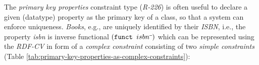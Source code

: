 \documentclass[a4paper,fontsize=11pt]{scrartcl}
\newcommand{\ms}[1]{\texttt{#1}}
\begin{document}
%
%
%
The \emph{primary key properties} constraint type (\emph{R-226}) is often useful to declare a given (datatype) property as the primary key of a class, so that a system can enforce uniqueness. 
\emph{Books}, e.g., are uniquely identified by their \emph{ISBN}, i.e., the property \emph{isbn} is inverse functional \ms{$(\ms{funct } isbn\sp{\overline{\ }})$}
which can be represented using the \emph{RDF-CV} in form of a \emph{complex constraint} consisting of two \emph{simple constraints} (Table \ref{tab:primary-key-properties-as-complex-constraints}):

\end{document}
